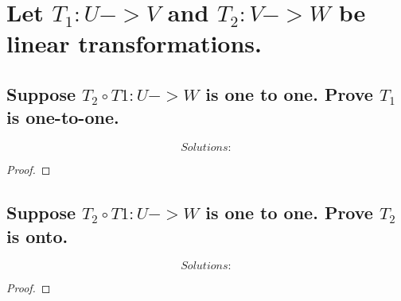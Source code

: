\documentclass[../main.tex]{subfiles}
\begin{document}
\section[Problem 3]{Let $T_{1}:U->V$ and $T_{2}:V->W$ be linear transformations.}
\subsection{Suppose $T_{2}\circ T{1}:U->W$ is one to one. Prove $T_{1}$ is one-to-one.}
\begin{equation*}
        \boxed{ Solutions:}
\end{equation*}
\begin{proof}
\end{proof}
\pagebreak
\subsection{Suppose $T_{2}\circ T{1}:U->W$ is one to one. Prove $T_{2}$ is onto.}
\begin{equation*}
        \boxed{ Solutions:}
\end{equation*}
\begin{proof}
\end{proof}
\end{document}
